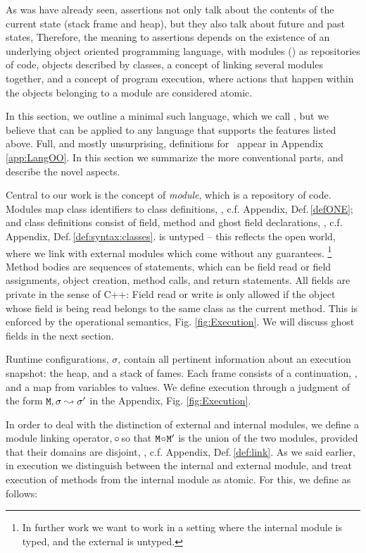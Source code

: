 \renewcommand{\appref}[1]{, c.f. Appendix, Def.\,\ref{#1}}
 
 
As was have already seen, \Chainmail assertions not only talk about the contents of the current state (stack frame and heap),
but they also talk about future and past states, Therefore, the meaning to \Chainmail assertions depends on the existence of an
underlying object oriented programming language, with modules (\M) as repositories of code, objects described by classes,
a concept of linking several modules together, and a concept of 
program execution, where  actions that happen within the objects belonging to a module are considered atomic.

In this section, we outline a minimal such language, which we call  \LangOO, but we believe that \Chainmail can be applied to 
any language that supports the features listed above. 
Full, and mostly unsurprising,
 definitions for  \LangOO~appear in Appendix \ref{app:LangOO}. 
In this section we summarize the more conventional parts, and describe the novel aspects. 

Central to our work is the concept of \emph{module}, which is a repository of code. Modules map class identifiers to class definitions, \appref{defONE}; and class definitions consist of field, method and ghost field declarations, \appref{def:syntax:classes}.  \LangOO is untyped -- this reflects the open world, where we link with external modules which come without any guarantees. \footnote{In further work we want to work in a setting where the internal module is typed, and the external is untyped.} Method bodies are sequences of
statements, which  can be field read or field assignments, object creation, method calls, and return statements.
All fields are private in the sense of C++: Field read or write is only allowed  if the object whose field is being read 
belongs to the same class as the current method. 
This is enforced by the operational semantics, \cf Fig.  \ref{fig:Execution}.
We will discuss ghost fields in the next section.

Runtime configurations, $\sigma$,  contain   all pertinent information about an execution snapshot: the heap, and a
stack of fames. Each frame consists of a continuation, , and a map from variables to values. 
We define execution  through a judgment of the form ${\mbox{\tt{\ensuremath{{\mbox{\tt{M}}}}}}}, \sigma \leadsto \sigma'$ in the Appendix, Fig.  \ref{fig:Execution}. 
%
  

In  order to deal with the distinction of external and internal modules, we define a module linking operator,  $\!\circ\!$ so that
${\mbox{\tt{\ensuremath{{\mbox{\tt{M}}}}}}}\!\circ\!{\mbox{\tt{\ensuremath{{\mbox{\tt{M}}}}}}}'$ is the union of the two modules, provided that their domains are disjoint, \appref{def:link}.
%
As we said earlier, in execution we distinguish  between the internal and external module, and treat  execution of 
methods from the internal module as atomic. For this, we define as follows:


